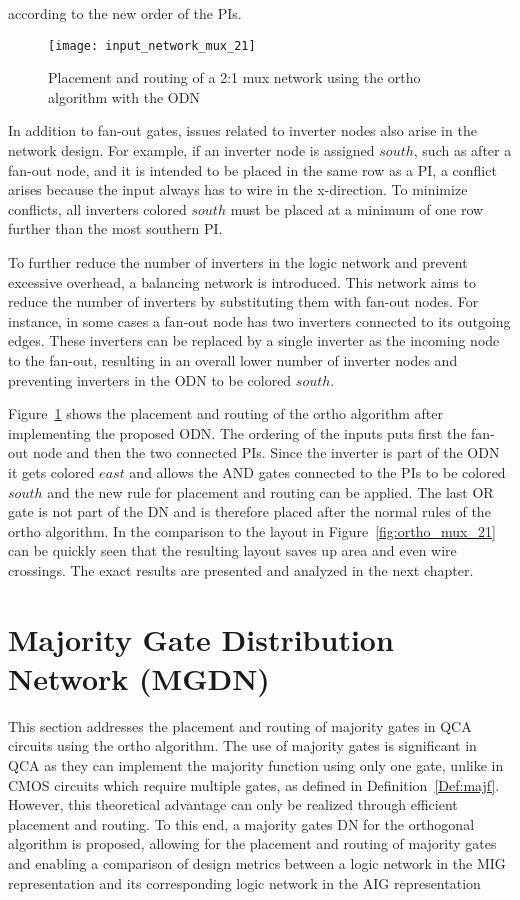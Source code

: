 according to the new order of the PIs.


\begin{figure}
	\centering
	\texttt{[image: input\_network\_mux\_21]}
	\caption{Placement and routing of a 2:1 mux network using the ortho algorithm with the ODN}\label{fig:input_network_mux_21}
\end{figure}

In addition to fan-out gates, issues related to inverter nodes also arise in the network design. For example, if an inverter node is assigned $south$, such as after a fan-out node, and it is intended to be placed in the same row as a PI, a conflict arises because the input always has to wire in the x-direction. To minimize conflicts, all inverters colored $south$ must be placed at a minimum of one row further than the most southern PI.

To further reduce the number of inverters in the logic network and prevent excessive overhead, a balancing network is introduced. This network aims to reduce the number of inverters by substituting them with fan-out nodes. For instance, in some cases a fan-out node has two inverters connected to its outgoing edges. These inverters can be replaced by a single inverter as the incoming node to the fan-out, resulting in an overall lower number of inverter nodes and preventing inverters in the ODN to be colored $south$.

Figure~\ref{fig:input_network_mux_21} shows the placement and routing of the ortho algorithm after implementing the proposed ODN. The ordering of the inputs puts first the fan-out node and then the two connected PIs. Since the inverter is part of the ODN it gets colored $east$ and allows the AND gates connected to the PIs to be colored $south$ and the new rule for placement and routing can be applied. The last OR gate is not part of the DN and is therefore placed after the normal rules of the ortho algorithm. In the comparison to the layout in Figure~\ref{fig:ortho_mux_21} can be quickly seen that the resulting layout saves up area and even wire crossings. The exact results are presented and analyzed in the next chapter.

\section{Majority Gate Distribution Network (MGDN)}\label{sec:majgatedisnet}
This section addresses the placement and routing of majority gates in QCA circuits using the ortho algorithm. The use of majority gates is significant in QCA as they can implement the majority function using only one gate, unlike in CMOS circuits which require multiple gates, as defined in Definition~\ref{Def:majf}. However, this theoretical advantage can only be realized through efficient placement and routing. To this end, a majority gates DN for the orthogonal algorithm is proposed, allowing for the placement and routing of majority gates and enabling a comparison of design metrics between a logic network in the MIG representation and its corresponding logic network in the AIG representation

